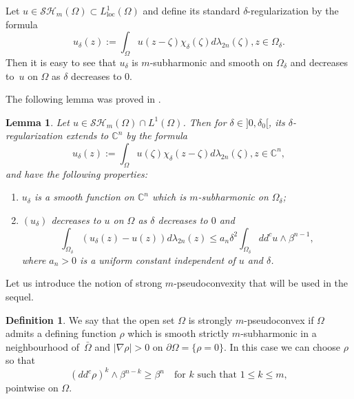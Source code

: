 \documentclass[11pt]{article}
\providecommand{\C}{}
\numberwithin{equation}{section}
\newcommand{\loc}{\mathrm{loc}}
\newtheorem{lemma}[theorem]{Lemma}
\theoremstyle{definition}
\newtheorem{definition}[theorem]{Definition}
\renewcommand{\C}{\mathbb{C}}
\theoremstyle{plain}
\theoremstyle{definition}
\begin{document}
Let $u \in \mathcal{SH}_m (\Omega) \subset L^1_{\loc} (\Omega)$ and define its standard $\delta$-regularization by the formula%
\begin{equation} \label{eq:reg}
{ u}_{\delta} (z):= \int_{\Omega} u (z - \zeta) \chi_{\delta} (\zeta) d \lambda_{2n} (\zeta), z \in \Omega_{\delta}.
\end{equation}
Then it is easy to see that $ {u}_{\delta}$ is $m$-subharmonic and smooth on $\Omega_{\delta}$ and decreases to~$u$ on $\Omega$ as $\delta $ decreases to $0$.

The following lemma was proved in \cite{GKZ08}.

\begin{lemma} \label{lem:Poisson-Jensen}
Let $u \in \mathcal{SH}_m (\Omega) \cap L^{1} (\Omega)$. Then for $\delta\in{}]0,\delta_0[$, its $\delta$-regularization extends to $\C^n$ by the formula
\begin{equation} \label{eq:regularization}
{ u}_{\delta} (z):= \int_{\Omega} u (\zeta) \chi_{\delta} (z - \zeta) d \lambda_{2n} (\zeta), z \in \C^n,
\end{equation}
and have the following properties:
\begin{enumerate}
\item
$ { u}_{\delta}$ is a smooth function on $\C^n$ which is $m$-subharmonic on $\Omega_\delta$;

\item
$({u}_\delta)$ decreases to $u$ on $\Omega$ as $\delta $ decreases to $0$ and
\[
\int_{\Omega_\delta} ( { u}_{\delta} (z) - u(z)) d\lambda_{2 n}(z) \leq a_n \delta^2 \int_{\Omega_\delta} dd^c u \wedge \beta^{n - 1},
\]
where $a_n > 0$ is a uniform constant independent of $u$ and $\delta$.
\end{enumerate}
\end{lemma}

Let us introduce the notion of strong $m$-pseudoconvexity that will be used in the sequel.

\begin{definition} We say that the open set $\Omega$ is strongly $m$-pseudoconvex if $\Omega$ admits a defining function $\rho$ which is smooth strictly $m$-subharmonic in a neighbourhood of~$\bar \Omega$ and $\vert \nabla \rho\vert > 0$ on $\partial \Omega = \{\rho = 0\}$. In this case we can choose $\rho $ so that
\begin{equation} \label{eq:stronpconvexity}
(dd^c \rho)^k \wedge \beta^{n - k} \geq \beta^n \quad \text{for $k$ such that }1 \leq k \leq m,
\end{equation}
pointwise on $\Omega$.
\end{definition}
\end{document}
